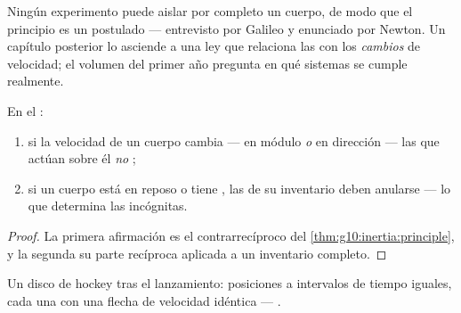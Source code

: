 \begin{remark}
Ningún experimento puede aislar por completo un cuerpo, de modo que el
principio es un postulado --- entrevisto por Galileo y enunciado por
Newton. Un capítulo posterior lo asciende a una ley que relaciona las
 con los \emph{cambios} de velocidad; el volumen del primer año
pregunta en qué sistemas se cumple realmente.
\end{remark}

\begin{proposition}\label{prop:g10:inertia:converse}
En el :
\begin{enumerate}
  \item si la velocidad de un cuerpo cambia --- en módulo \emph{o} en
        dirección --- las  que actúan sobre él \emph{no} ;
  \item si un cuerpo está en reposo o tiene , las  de su inventario deben anularse --- lo que
        determina las incógnitas.
\end{enumerate}
\end{proposition}

\begin{proof}
La primera afirmación es el contrarrecíproco del
\cref{thm:g10:inertia:principle}, y la segunda su parte recíproca
aplicada a un inventario completo.
\end{proof}

\begin{omfigure}

{\small Un disco de hockey tras el lanzamiento: posiciones a intervalos
de tiempo iguales, cada una con una flecha de velocidad idéntica ---
.}
\end{omfigure}

